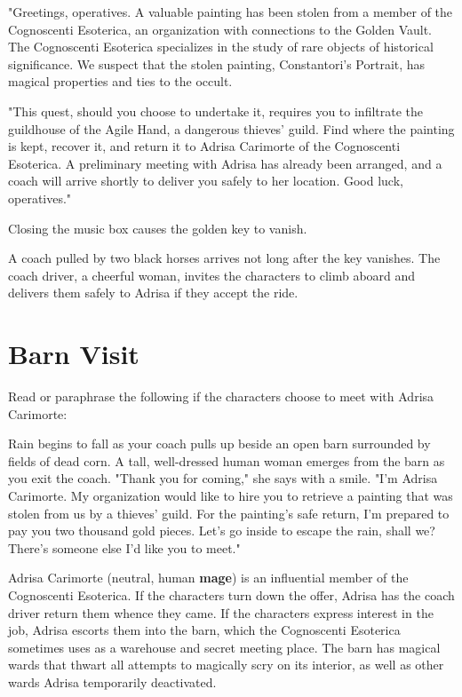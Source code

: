 \documentclass[10pt,a4paper,twoside,bg=print,twocolumn,openany,nodeprecatedcode]{dndbook}
\begin{document}
\begin{DndReadAloud}{}
"Greetings, operatives. A valuable painting has been stolen from a member of the Cognoscenti Esoterica, an organization with connections to the Golden Vault. The Cognoscenti Esoterica specializes in the study of rare objects of historical significance. We suspect that the stolen painting, Constantori's Portrait, has magical properties and ties to the occult.

"This quest, should you choose to undertake it, requires you to infiltrate the guildhouse of the Agile Hand, a dangerous thieves' guild. Find where the painting is kept, recover it, and return it to Adrisa Carimorte of the Cognoscenti Esoterica. A preliminary meeting with Adrisa has already been arranged, and a coach will arrive shortly to deliver you safely to her location. Good luck, operatives."

\end{DndReadAloud}

Closing the music box causes the golden key to vanish.

A coach pulled by two black horses arrives not long after the key vanishes. The coach driver, a cheerful woman, invites the characters to climb aboard and delivers them safely to Adrisa if they accept the ride.

\section{Barn Visit}
Read or paraphrase the following if the characters choose to meet with Adrisa Carimorte:

\begin{DndReadAloud}{}
Rain begins to fall as your coach pulls up beside an open barn surrounded by fields of dead corn. A tall, well-dressed human woman emerges from the barn as you exit the coach. "Thank you for coming," she says with a smile. "I'm Adrisa Carimorte. My organization would like to hire you to retrieve a painting that was stolen from us by a thieves' guild. For the painting's safe return, I'm prepared to pay you two thousand gold pieces. Let's go inside to escape the rain, shall we? There's someone else I'd like you to meet."

\end{DndReadAloud}

Adrisa Carimorte (neutral, human \textbf{mage}) is an influential member of the Cognoscenti Esoterica. If the characters turn down the offer, Adrisa has the coach driver return them whence they came. If the characters express interest in the job, Adrisa escorts them into the barn, which the Cognoscenti Esoterica sometimes uses as a warehouse and secret meeting place. The barn has magical wards that thwart all attempts to magically scry on its interior, as well as other wards Adrisa temporarily deactivated.
\end{document}
